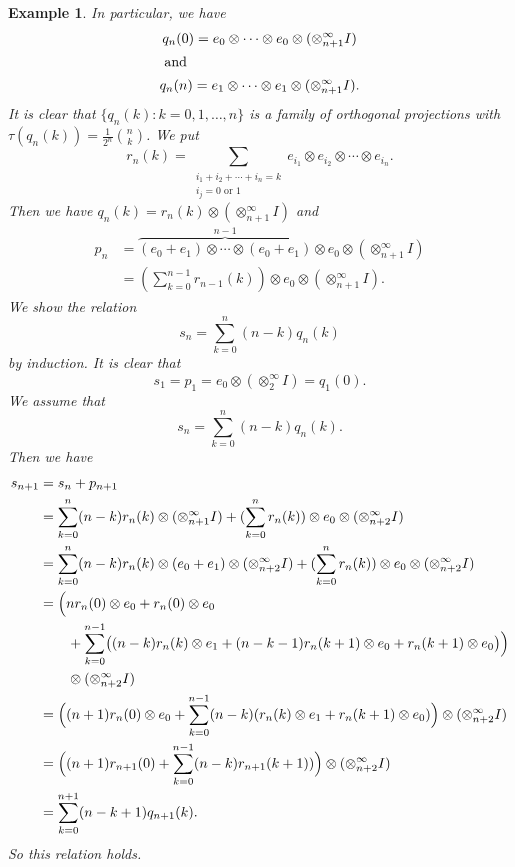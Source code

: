 \documentclass[a4paper,12pt]{amsart}
\newtheorem{example}[definition]{Example}
\begin{document}
\begin{example}
In particular, we have
\begin{gather*}
   q_n(0) = e_0\otimes \cdots \otimes e_0 \otimes(\otimes_{n+1}^\infty I)  \\
\intertext{ and }
     q_n(n) = e_1\otimes \cdots \otimes e_1 \otimes(\otimes_{n+1}^\infty I) .  
\end{gather*}
It is clear that $\{q_n(k) : k=0,1,\ldots,n \}$ is a family of orthogonal projections with
$\tau(q_n(k)) =\displaystyle \frac{1}{2^n}\binom{n}{k}$.
We put
\[   r_n(k) = \sum_{\substack{i_1+i_2+\cdots+i_n=k \\ i_j= 0 \text{ or } 1} }  e_{i_1}\otimes e_{i_2}\otimes \cdots \otimes e_{i_n} .\]
Then we have  $q_n(k) = r_n(k) \otimes (\otimes_{n+1}^\infty I)$ and
\begin{align*}
   p_n & = \overbrace{(e_0+e_1)\otimes \cdots \otimes (e_0+e_1)}^{n-1} \otimes e_0 \otimes (\otimes_{n+1}^\infty I)  \\
        & = ( \sum_{k=0}^{n-1} r_{n-1}(k) )\otimes e_0 \otimes (\otimes_{n+1}^\infty I).
\end{align*}
We show the relation
\[  s_n= \sum_{k=0}^n (n-k)q_n(k)  \]
by induction.
It is clear that 
\[   s_1 = p_1 = e_0\otimes (\otimes_2^\infty I) = q_1(0) .  \]
We assume that
\[   s_n = \sum_{k=0}^n (n-k)q_n(k) . \]
Then we have
\begin{align*}
  s_{n+1} & = s_n + p_{n+1}  \\
     & = \sum_{k=0}^n (n-k) r_n(k) \otimes  (\otimes_{n+1}^\infty I) 
           +  ( \sum_{k=0}^n r_n(k) )\otimes e_0 \otimes (\otimes_{n+2}^\infty I)  \\
     & = \sum_{k=0}^n (n-k) r_n(k) \otimes (e_0+e_1)\otimes  (\otimes_{n+2}^\infty I) 
           +  ( \sum_{k=0}^n r_n(k) )\otimes e_0 \otimes (\otimes_{n+2}^\infty I)  \\
     & = \Bigl( nr_n(0)\otimes e_0 + r_n(0) \otimes e_0 \\
        & \qquad  + \sum_{k=0}^{n-1} \bigl( (n-k)r_n(k) \otimes e_1 + (n-k-1)r_n(k+1)\otimes e_0 + r_n(k+1)\otimes e_0 \bigr)  \Bigr) \\
     & \qquad \otimes (\otimes_{n+2}^\infty I) \\
     & = \Bigl( (n+1)r_n(0)\otimes e_0    + \sum_{k=0}^{n-1}  (n-k) (r_n(k) \otimes e_1 + r_n(k+1)\otimes e_0)  \Bigr)  \otimes (\otimes_{n+2}^\infty I)  \\
     & = \Bigl( (n+1)r_{n+1}(0) + \sum_{k=0}^{n-1}  (n-k) r_{n+1}(k+1) ) \Bigr)  \otimes (\otimes_{n+2}^\infty I) \\
     & = \sum_{k=0}^{n+1} (n-k+1)q_{n+1}(k). 
\end{align*}
So this relation holds.


\end{example}
\end{document}
